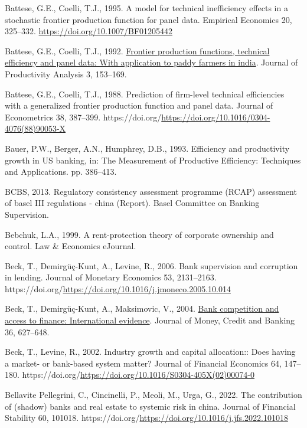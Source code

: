 \documentclass[
  12pt,
  a4paper,
]{scrreprt}
\newlength{\cslhangindent}
\newenvironment{CSLReferences}[2] %
 {\begin{list}{}{%
  \setlength{\itemindent}{0pt}
  \setlength{\leftmargin}{0pt}
  \setlength{\parsep}{0pt}
  \ifodd #1
   \setlength{\leftmargin}{\cslhangindent}
   \setlength{\itemindent}{-1\cslhangindent}
  \fi
  \setlength{\itemsep}{#2\baselineskip}}}
 {\end{list}}
\begin{document}
\begin{CSLReferences}{1}{0}
Battese, G.E., Coelli, T.J., 1995. A model for technical inefficiency
effects in a stochastic frontier production function for panel data.
Empirical Economics 20, 325--332.
\url{https://doi.org/10.1007/BF01205442}

Battese, G.E., Coelli, T.J., 1992.
\href{http://www.jstor.org/stable/41770578}{Frontier production
functions, technical efficiency and panel data: With application to
paddy farmers in india}. Journal of Productivity Analysis 3, 153--169.

Battese, G.E., Coelli, T.J., 1988. Prediction of firm-level technical
efficiencies with a generalized frontier production function and panel
data. Journal of Econometrics 38, 387--399.
https://doi.org/\url{https://doi.org/10.1016/0304-4076(88)90053-X}

Bauer, P.W., Berger, A.N., Humphrey, D.B., 1993. Efficiency and
productivity growth in US banking, in: The Measurement of Productive
Efficiency: Techniques and Applications. pp. 386--413.

BCBS, 2013. Regulatory consistency assessment programme (RCAP)
assessment of basel III regulations - china (Report). Basel Committee on
Banking Supervision.

Bebchuk, L.A., 1999. A rent-protection theory of corporate ownership and
control. Law \& Economics eJournal.

Beck, T., Demirgüç-Kunt, A., Levine, R., 2006. Bank supervision and
corruption in lending. Journal of Monetary Economics 53, 2131--2163.
https://doi.org/\url{https://doi.org/10.1016/j.jmoneco.2005.10.014}

Beck, T., Demirgüç-Kunt, A., Maksimovic, V., 2004.
\href{http://www.jstor.org.queens.ezp1.qub.ac.uk/stable/3838958}{Bank
competition and access to finance: International evidence}. Journal of
Money, Credit and Banking 36, 627--648.

Beck, T., Levine, R., 2002. Industry growth and capital allocation::
Does having a market- or bank-based system matter? Journal of Financial
Economics 64, 147--180.
https://doi.org/\url{https://doi.org/10.1016/S0304-405X(02)00074-0}

Bellavite Pellegrini, C., Cincinelli, P., Meoli, M., Urga, G., 2022. The
contribution of (shadow) banks and real estate to systemic risk in
china. Journal of Financial Stability 60, 101018.
https://doi.org/\url{https://doi.org/10.1016/j.jfs.2022.101018}


\end{CSLReferences}
\end{document}
